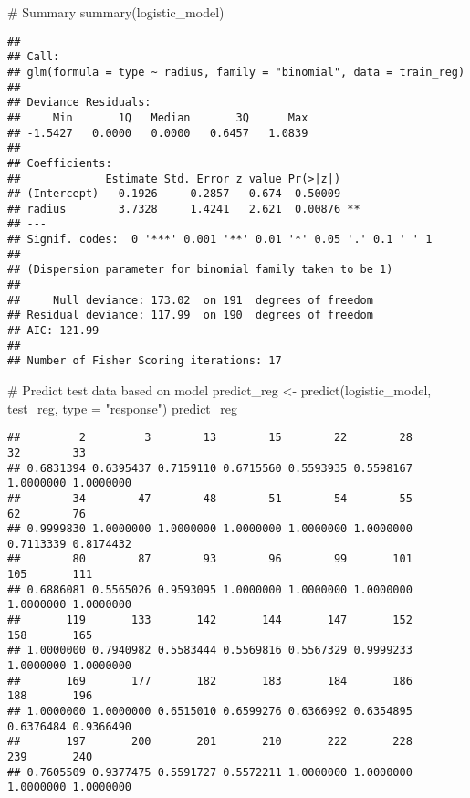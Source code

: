 \documentclass[
]{article}
\newenvironment{Shaded}{\begin{snugshade}}{\end{snugshade}}
\newcommand{\AttributeTok}[1]{\textcolor[rgb]{0.80,0.80,0.80}{#1}}
\newcommand{\CommentTok}[1]{\textcolor[rgb]{0.50,0.62,0.50}{#1}}
\newcommand{\FunctionTok}[1]{\textcolor[rgb]{0.94,0.94,0.56}{#1}}
\newcommand{\NormalTok}[1]{\textcolor[rgb]{0.80,0.80,0.80}{#1}}
\newcommand{\OtherTok}[1]{\textcolor[rgb]{0.94,0.94,0.56}{#1}}
\newcommand{\StringTok}[1]{\textcolor[rgb]{0.80,0.58,0.58}{#1}}
\begin{document}
\begin{Shaded}
\begin{Highlighting}[]
\CommentTok{\# Summary}
\FunctionTok{summary}\NormalTok{(logistic\_model)}
\end{Highlighting}
\end{Shaded}

\begin{verbatim}
## 
## Call:
## glm(formula = type ~ radius, family = "binomial", data = train_reg)
## 
## Deviance Residuals: 
##     Min       1Q   Median       3Q      Max  
## -1.5427   0.0000   0.0000   0.6457   1.0839  
## 
## Coefficients:
##             Estimate Std. Error z value Pr(>|z|)   
## (Intercept)   0.1926     0.2857   0.674  0.50009   
## radius        3.7328     1.4241   2.621  0.00876 **
## ---
## Signif. codes:  0 '***' 0.001 '**' 0.01 '*' 0.05 '.' 0.1 ' ' 1
## 
## (Dispersion parameter for binomial family taken to be 1)
## 
##     Null deviance: 173.02  on 191  degrees of freedom
## Residual deviance: 117.99  on 190  degrees of freedom
## AIC: 121.99
## 
## Number of Fisher Scoring iterations: 17
\end{verbatim}

\begin{Shaded}
\begin{Highlighting}[]
\CommentTok{\# Predict test data based on model}
\NormalTok{predict\_reg }\OtherTok{\textless{}{-}} \FunctionTok{predict}\NormalTok{(logistic\_model, test\_reg, }\AttributeTok{type =} \StringTok{"response"}\NormalTok{)}
\NormalTok{predict\_reg  }
\end{Highlighting}
\end{Shaded}

\begin{verbatim}
##         2         3        13        15        22        28        32        33 
## 0.6831394 0.6395437 0.7159110 0.6715560 0.5593935 0.5598167 1.0000000 1.0000000 
##        34        47        48        51        54        55        62        76 
## 0.9999830 1.0000000 1.0000000 1.0000000 1.0000000 1.0000000 0.7113339 0.8174432 
##        80        87        93        96        99       101       105       111 
## 0.6886081 0.5565026 0.9593095 1.0000000 1.0000000 1.0000000 1.0000000 1.0000000 
##       119       133       142       144       147       152       158       165 
## 1.0000000 0.7940982 0.5583444 0.5569816 0.5567329 0.9999233 1.0000000 1.0000000 
##       169       177       182       183       184       186       188       196 
## 1.0000000 1.0000000 0.6515010 0.6599276 0.6366992 0.6354895 0.6376484 0.9366490 
##       197       200       201       210       222       228       239       240 
## 0.7605509 0.9377475 0.5591727 0.5572211 1.0000000 1.0000000 1.0000000 1.0000000
\end{verbatim}
\end{document}
